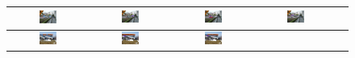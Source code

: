 \documentclass[10pt,twocolumn,letterpaper]{article}
\begin{document}
\begin{figure}[h]
\setlength\tabcolsep{1pt}
\centering
\begin{tabular}{|c|c|c|c|c|}
   \hline
  \includegraphics[width=0.24\textwidth]{car_cnn/1a.png} &   
  \includegraphics[width=0.24\textwidth]{car_cnn/1b.png} &   
  \includegraphics[width=0.24\textwidth]{car_cnn/1c.png} &   
  \includegraphics[width=0.24\textwidth]{car_cnn/1d.png}  \\  
   \hline
  \includegraphics[width=0.24\textwidth]{car_cnn/2a.png} &   
  \includegraphics[width=0.24\textwidth]{car_cnn/2b.png} &   
  \includegraphics[width=0.24\textwidth]{car_cnn/2c.png} &   

\end{tabular}
\end{figure}
\end{document}
